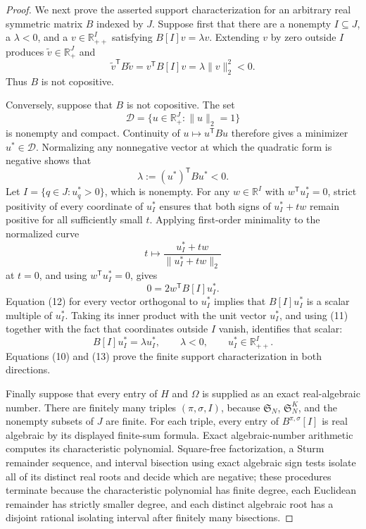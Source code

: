 \documentclass{article}
\begin{document}
\begin{proof}
We next prove the asserted support characterization for an arbitrary real symmetric matrix \(B\) indexed by \(J\).  Suppose first that there are a nonempty \(I\subseteq J\), a \(\lambda<0\), and a \(v\in\mathbb R_{++}^I\) satisfying \(B[I]v=\lambda v\).  Extending \(v\) by zero outside \(I\) produces \(\widetilde v\in\mathbb R_+^J\) and
\[
 \widetilde v^{\mathsf T}B\widetilde v
 =v^{\mathsf T}B[I]v
 =\lambda\lVert v\rVert_2^2<0. \tag{10}
\]
Thus \(B\) is not copositive.

Conversely, suppose that \(B\) is not copositive.  The set
\[
 \mathcal D=\{u\in\mathbb R_+^J:\lVert u\rVert_2=1\}
\]
is nonempty and compact.  Continuity of \(u\mapsto u^{\mathsf T}Bu\) therefore gives a minimizer \(u^*\in\mathcal D\).  Normalizing any nonnegative vector at which the quadratic form is negative shows that
\[
 \lambda:=(u^*)^{\mathsf T}Bu^*<0. \tag{11}
\]
Let \(I=\{q\in J:u_q^*>0\}\), which is nonempty.  For any \(w\in\mathbb R^I\) with \(w^{\mathsf T}u_I^*=0\), strict positivity of every coordinate of \(u_I^*\) ensures that both signs of \(u_I^*+tw\) remain positive for all sufficiently small \(t\).  Applying first-order minimality to the normalized curve
\[
 t\longmapsto\frac{u_I^*+tw}{\lVert u_I^*+tw\rVert_2}
\]
at \(t=0\), and using \(w^{\mathsf T}u_I^*=0\), gives
\[
 0=2w^{\mathsf T}B[I]u_I^*. \tag{12}
\]
Equation (12) for every vector orthogonal to \(u_I^*\) implies that \(B[I]u_I^*\) is a scalar multiple of \(u_I^*\).  Taking its inner product with the unit vector \(u_I^*\), and using (11) together with the fact that coordinates outside \(I\) vanish, identifies that scalar:
\[
 B[I]u_I^*=\lambda u_I^*,
 \qquad \lambda<0,
 \qquad u_I^*\in\mathbb R_{++}^I. \tag{13}
\]
Equations (10) and (13) prove the finite support characterization in both directions.

Finally suppose that every entry of \(H\) and \(\Omega\) is supplied as an exact real-algebraic number.  There are finitely many triples \((\pi,\sigma,I)\), because \(\mathfrak S_N\), \(\mathfrak S_N^K\), and the nonempty subsets of \(J\) are finite.  For each triple, every entry of \(B^{\pi,\sigma}[I]\) is real algebraic by its displayed finite-sum formula.  Exact algebraic-number arithmetic computes its characteristic polynomial.  Square-free factorization, a Sturm remainder sequence, and interval bisection using exact algebraic sign tests isolate all of its distinct real roots and decide which are negative; these procedures terminate because the characteristic polynomial has finite degree, each Euclidean remainder has strictly smaller degree, and each distinct algebraic root has a disjoint rational isolating interval after finitely many bisections.


\end{proof}
\end{document}
